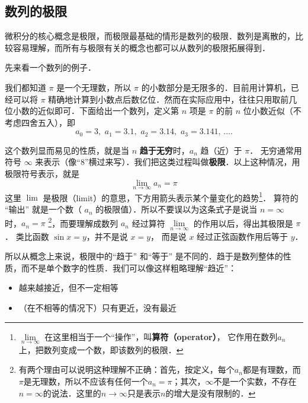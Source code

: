 
\subsection{数列的极限}

微积分的核心概念是极限，而极限最基础的情形是数列的极限．数列是离散的，比较容易理解，而所有与极限有关的概念也都可以从数列的极限拓展得到．

先来看一个数列的例子．

\begin{example}{}\label{Lim_ex1}
我们都知道 $\pi$ 是一个无理数，所以 $\pi$ 的小数部分是无限多的．目前用计算机，已经可以将 $\pi$ 精确地计算到小数点后数亿位．然而在实际应用中，往往只用取前几位小数的近似即可．下面给出一个数列，定义第 $n$ 项是 $\pi$ 的前 $n$ 位小数近似（不考虑四舍五入），即
\begin{equation}
a_0 = 3,\,\, a_1 = 3.1,\,\, a_2 = 3.14,\,\, a_3 = 3.141,\,\dots.
\end{equation}
\end{example}

这个数列显而易见的性质，就是当 $n$ \textbf{趋于无穷}时，$a_n$ 趋（近）于 $\pi$． 无穷通常用符号 $\infty$ 来表示（像“8”横过来写）．我们把这类过程叫做\textbf{极限}．以上这种情况，用极限符号表示，就是
\begin{equation}
\lim_{n \to \infty } {a_n} = \pi 
\end{equation}
这里 $\lim$ 是极限（limit）的意思，下方用箭头表示某个量变化的趋势\footnote{$\lim\limits_{n \to \infty }$ 在这里相当于一个“操作”，叫\textbf{算符（operator）}， 它作用在数列$a_n$ 上，把数列变成一个数，即该数列的极限．}． 算符的 “输出” 就是一个数（ $a_n$ 的极限值）．所以不要误以为这条式子是说当 $n = \infty$ 时，$a_n=\pi$ \footnote{有两个理由可以说明这种理解不正确：首先，按定义，每个$a_n$都是有理数，而$\pi$是无理数，所以不应该有任何一个$a_n=\pi$；其次，$\infty$不是一个实数，不存在$n=\infty$的说法．这里的$n\to\infty$只是表示$n$的增大是没有限制的．}，而要理解成数列 $a_n$ 经过算符 $\lim\limits_{n \to \infty }$ 的作用以后，得出其极限是 $\pi$． 类比函数 $\sin x = y$，并不是说 $x=y$， 而是说 $x$ 经过正弦函数作用后等于 $y$． 

所以从概念上来说，极限中的“趋于” 和“等于” 是不同的．趋于是数列整体的性质，而不是单个数字的性质．我们可以像这样粗略理解“趋近”：
\begin{itemize}
\item 越来越接近，但不一定相等
\item （在不相等的情况下）只有更近，没有最近
\end{itemize}

